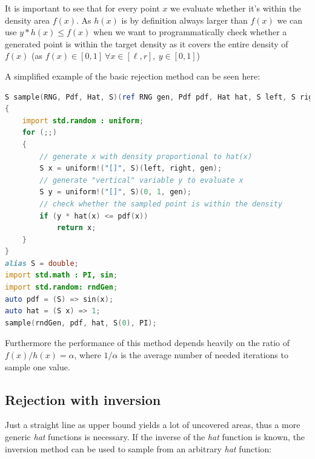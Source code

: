 It is important to see that for every point $x$ we evaluate whether it's within the density area $f(x)$. As $h(x)$ is by definition always larger than $f(x)$ we can use $y * h(x) \leq f(x)$ when we want to programmatically check whether a generated point is within the target density as it covers the entire density of $f(x)$ (as $f(x) \in [0, 1]\  \forall x \in [\ell, r],\  y \in [0, 1]$)

A simplified example of the basic rejection method can be seen here:

\begin{minipage}{\linewidth}
\begin{lstlisting}[language=D]
S sample(RNG, Pdf, Hat, S)(ref RNG gen, Pdf pdf, Hat hat, S left, S right)
{
    import std.random : uniform;
    for (;;)
    {
        // generate x with density proportional to hat(x)
        S x = uniform!("[]", S)(left, right, gen);
        // generate "vertical" variable y to evaluate x
        S y = uniform!("[]", S)(0, 1, gen);
        // check whether the sampled point is within the density
        if (y * hat(x) <= pdf(x))
            return x;
    }
}
alias S = double;
import std.math : PI, sin;
import std.random: rndGen;
auto pdf = (S) => sin(x);
auto hat = (S x) => 1;
sample(rndGen, pdf, hat, S(0), PI);
\end{lstlisting}
\end{minipage}

Furthermore the performance of this method depends heavily on the ratio of $f(x) / h(x) = \alpha$, where $1 / \alpha$ is the average number of needed iterations to sample one value.

\subsection{Rejection with inversion}
\label{subsection:rejection_inversion}

Just a straight line as upper bound yields a lot of uncovered areas, thus a more generic \textit{hat} functions is necessary.
If the inverse of the \textit{hat} function is known, the inversion method can be used to sample from an arbitrary \textit{hat} function:

